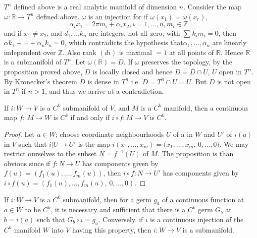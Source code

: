 \begin{example*}
  $T^n$ defined above is a real analytic manifold of dimension
  $n$. Consider the map $\omega: \mathbb{R} \to T^n$ defined
  above. $\omega$ is an injection for if $\omega (x_1) = \omega
  (x_r)$, 
  $$
  \alpha_i x_1 = 2 \pi m_i + \alpha_i x_2, i = 1, \ldots ,n, m_i \in \mathbb{Z}
  $$
  and if $x_1 \neq x_2$, and $d_1,\ldots k_n$ are integers, not all
  zero, with $\sum k_i m_i = 0$, then $\alpha k_1 + \cdots + \alpha_n
  k_n = 0$, which contradicts the hypothesis  that\pageoriginale $\alpha_1, \ldots,
  \alpha_n$ are linearly independent over $\mathbb{Z}$. Also rank
  $(di)$ is maximal $= 1$ at all points of $\mathbb{R}$. Hence
  $\mathbb{R}$ is a submanifold of $T^n$.  Let $\omega (\mathbb{R}) =
  D$. If $\omega$ preserves the topology, by the proposition proved
  above, $D$ is locally closed and hence $D = \bar{D} \cap U$, $U$
  open in $T^n$. By Kronecker's theorem $D$ is dense in $T^n$ i.e. $D
  = T^n \cap U =U$. But $D$ is not open in $T^n$ if $n > 1$, and thus
  we arrive at a contradiction. 
\end{example*}

\begin{proposition}\label{chap2:sec3:prop2} %
  If $i: W \to V$ is a $C^k$ submanifold of $V$, and $M$ is a $C^k$
  manifold, then a continuous map $f$: $M \to W$ is $C^k$ if and only
  if $i \circ f: M \to V$ is $C^k$. 
\end{proposition}

\begin{proof}
  Let $a \in W$; choose coordinate neighbourhoods $U$ of a  in $W$ and
  $U'$ of $i (a)$ in $V$ such that $i \big| U \to U'$ is the map $i
  (x_1, \ldots,x_m) = (x_1, \ldots, x_m$, $0, \ldots , 0)$. We may
  restrict ourselves  to the subset $N = f^{-1} (U)$ of $M$. The
  proposition is than obvious since if $f : N \to U$ has components
  given by $f (u) = ( f_1 (u), \ldots , f_m(u))$, then $i \circ f: N \to
  U'$ has components given by  $i \circ f (u) = (f_1 (u), \ldots , f_m (u),
  ~ 0, \ldots, 0 )$. 
\end{proof}

\begin{proposition}\label{chap2:sec3:prop3} %
  If $i: W \to V$ is a $C^k$ submanifold, then for a germ $g_a$ of a
  continuous function at $a \in W$ to be $C^k$, it is necessary and
  sufficient that there is a $C^k$ germ $G_b$ at $b = i (a)$ such that
  $G_b \circ i = g_a$. Conversely. if $i$ is a continuous injection of the
  $C^k$ manifold $W$ into $V$ having this property, then $i : W \to V$
  is a submanifold. 
\end{proposition}

